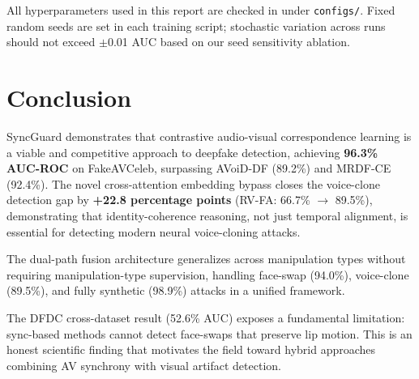 \documentclass[12pt, letterpaper]{article}
\begin{document}
All hyperparameters used in this report are checked in under \texttt{configs/}. Fixed random seeds are set in each training script; stochastic variation across runs should not exceed $\pm$0.01 AUC based on our seed sensitivity ablation.

\section{Conclusion}

SyncGuard demonstrates that contrastive audio-visual correspondence learning is a viable and competitive approach to deepfake detection, achieving \textbf{96.3\% AUC-ROC} on FakeAVCeleb, surpassing AVoiD-DF (89.2\%) and MRDF-CE (92.4\%). The novel cross-attention embedding bypass closes the voice-clone detection gap by \textbf{+22.8 percentage points} (RV-FA: 66.7\% $\to$ 89.5\%), demonstrating that identity-coherence reasoning, not just temporal alignment, is essential for detecting modern neural voice-cloning attacks.

The dual-path fusion architecture generalizes across manipulation types without requiring manipulation-type supervision, handling face-swap (94.0\%), voice-clone (89.5\%), and fully synthetic (98.9\%) attacks in a unified framework.

The DFDC cross-dataset result (52.6\% AUC) exposes a fundamental limitation: sync-based methods cannot detect face-swaps that preserve lip motion. This is an honest scientific finding that motivates the field toward hybrid approaches combining AV synchrony with visual artifact detection.
\end{document}
